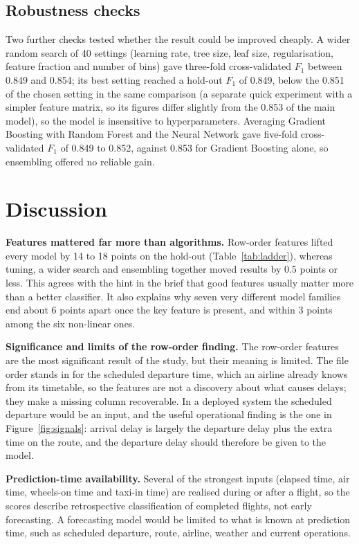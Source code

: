 \documentclass[12pt,a4paper]{article}
\newcommand{\Fone}{$F_1$}
\begin{document}
\subsection{Robustness checks}\label{sec:robust}
Two further checks tested whether the result could be improved cheaply. A wider random search of 40 settings (learning rate, tree size, leaf size, regularisation, feature fraction and number of bins) gave three-fold cross-validated \Fone{} between 0.849 and 0.854; its best setting reached a hold-out \Fone{} of 0.849, below the 0.851 of the chosen setting in the same comparison (a separate quick experiment with a simpler feature matrix, so its figures differ slightly from the 0.853 of the main model), so the model is insensitive to hyperparameters. Averaging Gradient Boosting with Random Forest and the Neural Network gave five-fold cross-validated \Fone{} of 0.849 to 0.852, against 0.853 for Gradient Boosting alone, so ensembling offered no reliable gain.

\section{Discussion}
\textbf{Features mattered far more than algorithms.} Row-order features lifted every model by 14 to 18 points on the hold-out (Table~\ref{tab:ladder}), whereas tuning, a wider search and ensembling together moved results by 0.5 points or less. This agrees with the hint in the brief that good features usually matter more than a better classifier. It also explains why seven very different model families end about 6 points apart once the key feature is present, and within 3 points among the six non-linear ones.

\textbf{Significance and limits of the row-order finding.} The row-order features are the most significant result of the study, but their meaning is limited. The file order stands in for the scheduled departure time, which an airline already knows from its timetable, so the features are not a discovery about what causes delays; they make a missing column recoverable. In a deployed system the scheduled departure would be an input, and the useful operational finding is the one in Figure~\ref{fig:signals}: arrival delay is largely the departure delay plus the extra time on the route, and the departure delay should therefore be given to the model.

\textbf{Prediction-time availability.} Several of the strongest inputs (elapsed time, air time, wheels-on time and taxi-in time) are realised during or after a flight, so the scores describe retrospective classification of completed flights, not early forecasting. A forecasting model would be limited to what is known at prediction time, such as scheduled departure, route, airline, weather and current operations.
\end{document}
